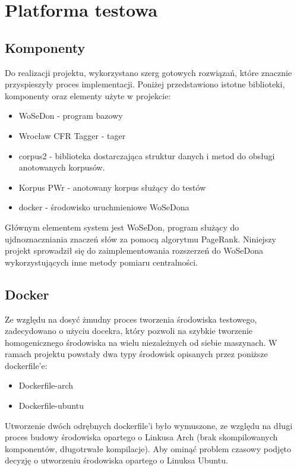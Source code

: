 \chapter{Platforma testowa}
\section{Komponenty}
Do realizacji projektu, wykorzystano szerg gotowych rozwiązań, które znacznie przyspieszyły proces implementacji. Poniżej przedstawiono istotne biblioteki, komponenty oraz elementy użyte w projekcie:
\begin{itemize}
\item WoSeDon - program bazowy
\item Wrocław CFR Tagger - tager 
\item corpus2 - biblioteka dostarczająca struktur danych i metod do obsługi anotowanych korpusów.
\item Korpus PWr - anotowany korpus służący do testów
\item docker - środowisko uruchmieniowe WoSeDona
\end{itemize}

Głównym elementem system jest WoSeDon, program służący do ujdnoznaczniania znaczeń słów za pomocą algorytmu PageRank. Niniejszy projekt sprowadził się do zaimplementowania rozszerzeń do WoSeDona wykorzystujących inne metody pomiaru centralności.
\section{Docker}
Ze względu na dosyć żmudny proces tworzenia środowiska testowego, zadecydowano o użyciu docekra, który pozwoli na szybkie tworzenie homogenicznego środowiska na wielu niezależnych od siebie maszynach. W ramach projektu powstały dwa typy środowisk opisanych przez poniższe dockerfile'e:
\begin{itemize}
\item Dockerfile-arch
\item Dockerfile-ubuntu
\end{itemize}

Utworzenie dwóch odrębnych dockerfile'i było wymuszone, ze względu na długi proces budowy środowiska opartego o Linkusa Arch (brak skompilowanych komponentów, długotrwałe kompilacje). Aby ominąć problem czasowy podjęto decyzję o utworzeniu środowiska opartego o Linuksa Ubuntu.